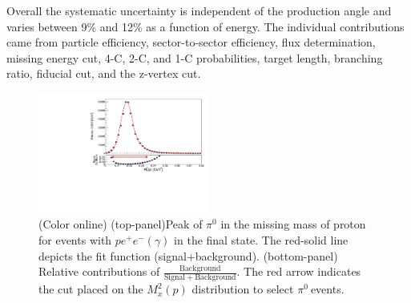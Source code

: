 \documentclass[aps,prc,twocolumn,floatfix,showpacs,preprintnumbers,amsmath,amssymb,superscriptaddress]{revtex4-1}
\def\pizT{$\pi^{0} \ $}
\begin{document}
Overall the systematic uncertainty is independent of the production angle and varies 
between 9\% and 12\% as a function of energy. The 
individual contributions came from particle efficiency, 
sector-to-sector efficiency, flux determination, missing energy cut, 
4-C, 2-C, and 1-C probabilities, target length, branching 
ratio, fiducial cut, and the z-vertex cut.
\begin{figure}[htb!]
\centerline{
        \includegraphics[height=0.4\textwidth,width=0.5\textwidth]{G12_Pi0_wBck.pdf}}

        \caption {(Color online) (top-panel)Peak of $\pi^0$ in the missing
                mass of proton for events with $pe^+e^-(\gamma)$
                in the final state. The red-solid line depicts the fit function (signal+background).
                (bottom-panel) Relative contributions of $\frac{\mathrm{Background}}{\mathrm{Signal + Background}}$. The red arrow indicates the cut placed on the $M_x^2(p)$ distribution to select \pizT events.} \label{fig:pi0_peak}
\end{figure}
\end{document}
